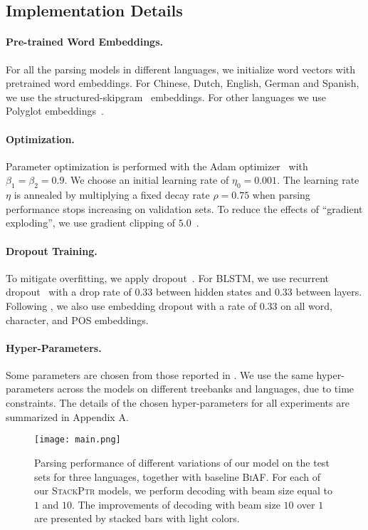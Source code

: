 \documentclass[11pt,a4paper]{article}
\begin{document}
\subsection{Implementation Details}\label{subsec:opt}
\paragraph{Pre-trained Word Embeddings.} For all the parsing models in different languages, we initialize word vectors with pretrained word embeddings. 
For Chinese, Dutch, English, German and Spanish, we use the structured-skipgram~\cite{ling-EtAl:2015:NAACL-HLT} embeddings. 
For other languages we use Polyglot embeddings~\cite{polyglot:2013:CoNLL}. 

\paragraph{Optimization.} Parameter optimization is performed with the Adam optimizer~\cite{kingma2014adam} with $\beta_1 = \beta_2 = 0.9$.
We choose an initial learning rate of $\eta_0 = 0.001$. The learning rate $\eta$ is annealed by multiplying a fixed decay rate $\rho = 0.75$ when parsing performance stops increasing on validation sets.
To reduce the effects of ``gradient exploding'', we use gradient clipping of $5.0$~\cite{pascanu2013}.

\paragraph{Dropout Training.} To mitigate overfitting, we apply dropout~\cite{srivastava2014dropout,iclr2017:ma:dropout}.
For BLSTM, we use recurrent dropout~\cite{gal2016dropout:rnn} with a drop rate of 0.33 between hidden states and 0.33 between layers.
Following \citet{dozat2017:ICLR}, we also use embedding dropout with a rate of 0.33 on all word, character, and POS embeddings.

\paragraph{Hyper-Parameters.}  
Some parameters are chosen from those reported in \citet{dozat2017:ICLR}.
We use the same hyper-parameters across the models on different treebanks and languages, due to time constraints.
The details of the chosen hyper-parameters for all experiments are summarized in Appendix A.

\begin{figure*}[t]
\centering
\texttt{[image: main.png]}
\caption{Parsing performance of different variations of our model on the test sets for three languages, together with baseline \textsc{BiAF}. 
For each of our \textsc{StackPtr} models, we perform decoding with beam size equal to $1$ and $10$. 
The improvements of decoding with beam size $10$ over $1$ are presented by stacked bars with light colors.}
\label{fig:main:results}
\vspace{-.5cm}
\end{figure*}
			
\end{document}
